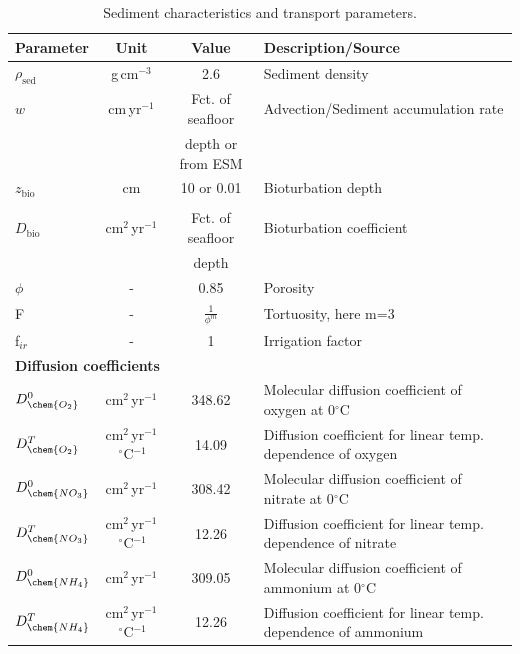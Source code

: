 \documentclass[gmd, manuscript]{copernicus}
\begin{document}
\begin{table}[hbtp]
\caption{Sediment characteristics and transport parameters.}
\centering
\begin{tabular}{l c c l}
\hline\hline
Parameter & Unit  & Value & Description/Source\\
\hline
$\rho_{\mathrm{sed}}$ & g\,cm$^{-3}$ & 2.6 & Sediment density \\
$w$ & cm\,yr$^{-1}$ &  Fct. of seafloor & Advection/Sediment accumulation rate \\
&& depth or from ESM & \citep{middelburg_empirical_1997}\\
$z_{\mathrm{bio}}$& cm & 10 or 0.01 & Bioturbation depth\\
&&&\citep{boudreau_mean_1998, teal_global_2010}\\
$D_{\mathrm{bio}}$& cm$^2$\,yr$^{-1}$ & Fct. of seafloor & Bioturbation coefficient\\
&& depth &\citep{middelburg_empirical_1997}\\
$\phi$ & - & 0.85 & Porosity\\
F & - &  $\frac{1}{\phi^m}$ & Tortuosity, here m=3\\
f$_{ir}$ & - & 1 & Irrigation factor\\
\multicolumn{4}{l}{\textbf{Diffusion coefficients} \citep{Li_diffusion_1974, schulz_quantification_2006, gypens_simple_2008}}\\
$D_{\chem{O_2}}^0$ & cm$^2$\,yr$^{-1}$ & 348.62 &Molecular diffusion coefficient of oxygen at 0$^\circ$C\\
$D_{\chem{O_2}}^T$ & cm$^2$\,yr$^{-1}$\,${}^{\circ}$C$^{-1}$ & 14.09 &Diffusion coefficient for linear temp. dependence of oxygen\\ %
$D_{\chem{NO_3}}^0$ & cm$^2$\,yr$^{-1}$ & 308.42 &Molecular diffusion coefficient of nitrate at 0$^\circ$C\\
$D_{\chem{NO_3}}^T$ & cm$^2$\,yr$^{-1}$\,${}^{\circ}$C$^{-1}$ & 12.26 &Diffusion coefficient for linear temp. dependence of nitrate\\ %
$D_{\chem{NH_4}}^0$ & cm$^2$\,yr$^{-1}$ & 309.05 &Molecular diffusion coefficient of ammonium at 0$^\circ$C\\
$D_{\chem{NH_4}}^T$ & cm$^2$\,yr$^{-1}$\,${}^{\circ}$C$^{-1}$ & 12.26 &Diffusion coefficient for linear temp. dependence of ammonium\\ %

\end{tabular}
\end{table}
\end{document}
